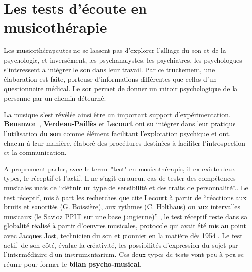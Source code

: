 \section*{Les tests d'écoute en musicothérapie}
\label{musicothEtpsycho}
Les musicothérapeutes ne se lassent pas d'explorer l'alliage du son
 et de la psychologie, et inversément, les psychanalystes, les psychiatres, les psychologues
 s'intéressent à intégrer le son dans leur travail. Par ce truchement,
 une élaboration est faite, porteuse d'informations différentes que
 celles d'un questionnaire médical. Le son permet de donner un miroir
 psychologique de la personne par un chemin détourné.

La musique s'est révélée ainsi être un important support
         d'expérimentation.   \textbf{Benenzon} \autocite{benenzon:musicotherapie},\textbf{ Verdeau-Paillès} \autocite{verdeau-pailles:bilan} et
         \textbf{Lecourt }\autocite{lecourt_les_2017}
         ont su intégrer dans leur pratique l'utilisation du\textbf{ son }comme
         élément facilitant l'exploration psychique et
         ont, chacun à leur manière, élaboré des procédures destinées à faciliter
         l'introspection et la communication.


         A proprement parler, avec le terme "test" en musicothérapie, il en existe deux types, le réceptif et l'actif. Il ne s'agit en aucun cas de tester des compétences musicales mais de \enquote {définir un type de sensibilité et des traits de personnalité}.\autocite[83]{lecourt_les_2017}.
Le test réceptif, mis à part les recherches que cite Lecourt à partir de \enquote {réactions aux bruits et sonorités (G. Boissière), aux rythmes (C. Holthaus) ou aux intervalles musicaux (le Savioz PPIT sur une base jungienne)} \autocite[83]{lecourt_les_2017}, le test réceptif reste dans sa globalité réalisé à partir d'oeuvres musicales, protocole qui avait été mis au point avec Jacques Jost, technicien du son et pionnier en la matière dès 1954 \autocite{Jost}.
         Le test actif, de son côté, évalue la créativité, les possibilités d'expression du sujet par l'intermédiaire d'un instrumentarium. Ces deux types  de tests vont peu à peu se réunir pour former
                 le \textbf{ bilan
                     psycho-musical}.


